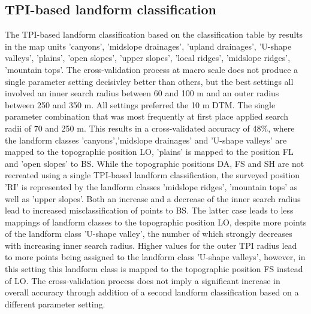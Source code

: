 \documentclass[preprint,12pt,authoryear]{elsarticle}
\begin{document}
\subsection{TPI-based landform classification}
The TPI-based landform classification based on the  classification table by \cite{Weiss2000} results in the map units 'canyons', 'midslope drainages', 'upland drainages', 'U-shape valleys', 'plains', 'open slopes', 'upper slopes', 'local ridges', 'midslope ridges', 'mountain tops'. The cross-validation process at macro scale does not produce a single parameter setting decisivley better than others, but the best settings all involved an inner search radius between 60 and 100 m and an outer radius between 250  and 350 m. All settings preferred the 10 m DTM. The single parameter combination that was most frequently at first place applied search radii of 70 and 250 m. This results in a cross-validated accuracy of 48\%, where the landform classes 'canyons','midslope drainages' and 'U-shape valleys' are mapped to the topographic position LO, 'plains' is mapped to the position FL and 'open slopes' to BS. While the topographic positions DA, FS and SH are not recreated using a single TPI-based landform classification, the surveyed position 'RI' is represented by the landform classes 'midslope ridges', 'mountain tops' as well as 'upper slopes'. Both an increase and a decrease of the inner search radius lead to increased misclassification of points to BS. The latter case leads to less mappings of landform classes to the topographic position LO, despite more points of the landform class 'U-shape valley', the number of which strongly decreases with increasing inner search radius. Higher values for the outer TPI radius lead to more points being assigned to the landform class 'U-shape valleys', however, in this setting this landform class is mapped to the topographic position FS instead of LO. The cross-validation process does not imply a significant increase in overall accuracy through addition of a second landform classification based on a different parameter setting.   
\end{document}
